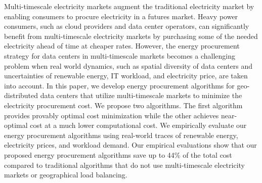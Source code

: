 Multi-timescale electricity markets augment the traditional electricity market by enabling consumers to procure electricity in a futures market. Heavy power consumers, such as cloud providers and data center operators, can significantly benefit from multi-timescale electricity markets by purchasing some of the needed electricity ahead of time at cheaper rates. However, the energy procurement strategy for data centers in multi-timescale markets becomes a challenging problem when real world dynamics, such as spatial diversity of data centers and uncertainties of renewable energy, IT workload, and electricity price, are taken into account. In this paper, we develop energy procurement algorithms for geo-distributed data centers that utilize multi-timescale markets to minimize the electricity procurement cost. We propose two algorithms. The first algorithm provides provably optimal cost minimization while the other achieves near-optimal cost at a much lower computational cost. We empirically evaluate our energy procurement algorithms using real-world traces of renewable energy, electricity prices, and workload demand. Our empirical evaluations show that our proposed energy procurement algorithms save up to 44\% of the total cost compared to traditional algorithms that do not use multi-timescale electricity markets or geographical load balancing.